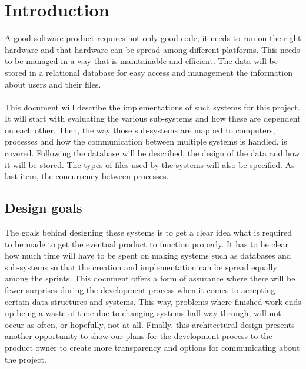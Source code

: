\section{Introduction}
A good software product requires not only good code, it needs to run on the right hardware and that hardware can be spread among different platforms. This needs to be managed in a way that is maintainable and efficient. The data will be stored in a relational database for easy access and management the information about users and their files.
\paragraph{}
This document will describe the implementations of such systems for this project. It will start with evaluating the various sub-systems and how these are dependent on each other. Then, the way those sub-systems are mapped to computers, processes and how the communication between multiple systems is handled, is covered. 
Following the database will be described, the design of the data and how it will be stored. The types of files used by the systems will also be specified. 
As last item, the concurrency between processes.
\subsection{Design goals}
The goals behind designing these systems is to get a clear idea what is required to be made to get the eventual product to function properly. It has to be clear how much time will have to be spent on making systems such as databases and sub-systems so that the creation and implementation can be spread equally among the sprints. This document offers a form of assurance where there will be fewer surprises during the development process when it comes to accepting certain data structures and systems. This way, problems where finished work ends up being a waste of time due to changing systems half way through, will not occur as often, or hopefully, not at all.
Finally, this architectural design presents another opportunity to show our plans for the development process to the product owner to create more transparency and options for communicating about the project.


